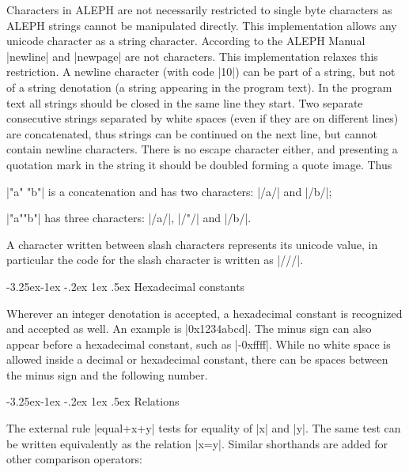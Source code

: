 \documentclass[titlepage]{article}
\makeatletter
\newcommand\A{\textsf{ALEPH}}
\newcommand\g[1]{\textsf{\color{blue!90!black}#1}}
\renewcommand\subsection{%
\@startsection{subsection}{2}{\z@}%
   {-3.25ex\@plus -1ex \@minus -.2ex}%
   {1ex \@plus .5ex}%
   {\normalfont\normalsize\bfseries}}
\makeatother
\begin{document}
Characters in \A{} are not necessarily restricted to single byte characters as
\A{} strings cannot be manipulated directly. This implementation allows any
unicode character as a string character. According to the \A{} Manual
\pp|newline| and \pp|newpage| are not characters. This implementation
relaxes this restriction. A newline character (with code \pp|10|) can be
part of a string, but not of a \g{string denotation} (a string appearing in
the program text). In the program text all strings should be closed in the
same line they start. Two separate consecutive strings separated by white
spaces (even if they are on
different lines) are concatenated, thus strings can be continued on the next
line, but cannot contain newline characters. There is no escape character
either, and presenting a quotation mark in the string it should be doubled
forming a \g{quote image}. Thus

\smallskip

\HH\pp|"a" "b"| \HE is a concatenation and has two characters: \pp|/a/| and
\pp|/b/|;

\HH\pp|"a""b"|  \HE has three characters: \pp|/a/|, \pp|/"/| and \pp|/b/|.

\smallskip
\noindent
A character written between slash characters represents its unicode value,
in particular the code for the slash character is written as \pp|///|.
 

\subsection{Hexadecimal constants}

Wherever an \g{integer denotation} is accepted, a hexadecimal constant is
recognized and accepted as well. An example is \pp|0x1234abcd|. The
minus sign can also appear before a hexadecimal constant, such as \pp|-0xffff|.
While no white space is allowed inside a decimal or hexadecimal constant, 
there can be spaces between the minus sign and the following number.


\subsection{Relations}\label{subsec:relations}

The external rule \pp|equal+x+y| tests for equality of \pp|x| and \pp|y|.
The same test can be written equivalently as the \g{relation} \pp|x=y|.
Similar shorthands are added for other comparison operators:
\end{document}
